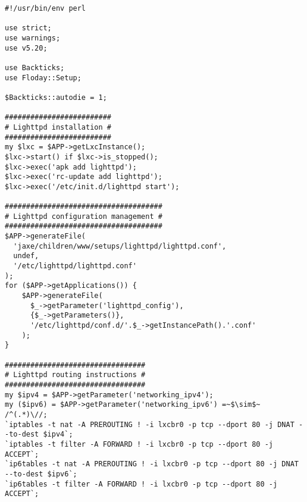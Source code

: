 \begin{lstlisting}[float=t, caption={Exemple de script de setup}, label=fig_1.3_setup]
#!/usr/bin/env perl

use strict;
use warnings;
use v5.20;

use Backticks;
use Floday::Setup;

$Backticks::autodie = 1;

#########################
# Lighttpd installation #
#########################
my $lxc = $APP->getLxcInstance();
$lxc->start() if $lxc->is_stopped();
$lxc->exec('apk add lighttpd');
$lxc->exec('rc-update add lighttpd');
$lxc->exec('/etc/init.d/lighttpd start');

#####################################
# Lighttpd configuration management #
#####################################
$APP->generateFile(
  'jaxe/children/www/setups/lighttpd/lighttpd.conf',
  undef,
  '/etc/lighttpd/lighttpd.conf'
);
for ($APP->getApplications()) {
	$APP->generateFile(
	  $_->getParameter('lighttpd_config'),
	  {$_->getParameters()},
	  '/etc/lighttpd/conf.d/'.$_->getInstancePath().'.conf'
	);
}

#################################
# Lighttpd routing instructions #
#################################
my $ipv4 = $APP->getParameter('networking_ipv4');
my ($ipv6) = $APP->getParameter('networking_ipv6') =~$\sim$~ /^(.*)\//;
`iptables -t nat -A PREROUTING ! -i lxcbr0 -p tcp --dport 80 -j DNAT --to-dest $ipv4`;
`iptables -t filter -A FORWARD ! -i lxcbr0 -p tcp --dport 80 -j ACCEPT`;
`ip6tables -t nat -A PREROUTING ! -i lxcbr0 -p tcp --dport 80 -j DNAT --to-dest $ipv6`;
`ip6tables -t filter -A FORWARD ! -i lxcbr0 -p tcp --dport 80 -j ACCEPT`;
\end{lstlisting}
